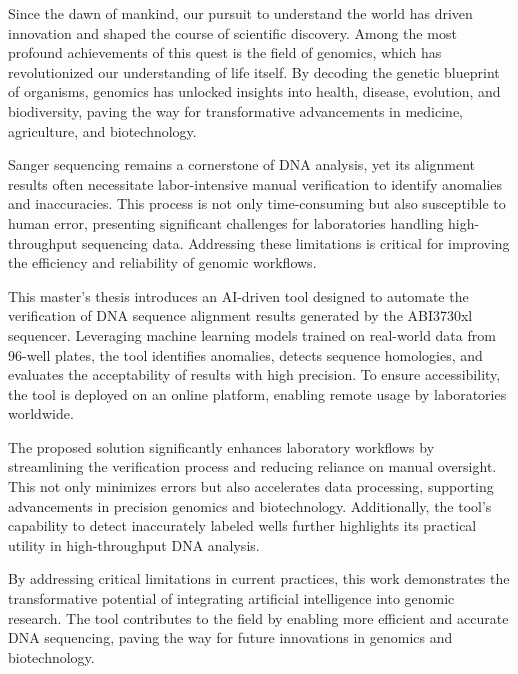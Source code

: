 
%

Since the dawn of mankind, our pursuit to understand the world has driven innovation and shaped the course of scientific discovery. Among the most profound achievements of this quest is the field of genomics, which has revolutionized our understanding of life itself. By decoding the genetic blueprint of organisms, genomics has unlocked insights into health, disease, evolution, and biodiversity, paving the way for transformative advancements in medicine, agriculture, and biotechnology.

Sanger sequencing remains a cornerstone of DNA analysis, yet its alignment results often necessitate labor-intensive manual verification to identify anomalies and inaccuracies. This process is not only time-consuming but also susceptible to human error, presenting significant challenges for laboratories handling high-throughput sequencing data. Addressing these limitations is critical for improving the efficiency and reliability of genomic workflows.

This master's thesis introduces an AI-driven tool designed to automate the verification of DNA sequence alignment results generated by the ABI3730xl sequencer. Leveraging machine learning models trained on real-world data from 96-well plates, the tool identifies anomalies, detects sequence homologies, and evaluates the acceptability of results with high precision. To ensure accessibility, the tool is deployed on an online platform, enabling remote usage by laboratories worldwide.

The proposed solution significantly enhances laboratory workflows by streamlining the verification process and reducing reliance on manual oversight. This not only minimizes errors but also accelerates data processing, supporting advancements in precision genomics and biotechnology. Additionally, the tool’s capability to detect inaccurately labeled wells further highlights its practical utility in high-throughput DNA analysis.

By addressing critical limitations in current practices, this work demonstrates the transformative potential of integrating artificial intelligence into genomic research. The tool contributes to the field by enabling more efficient and accurate DNA sequencing, paving the way for future innovations in genomics and biotechnology.

